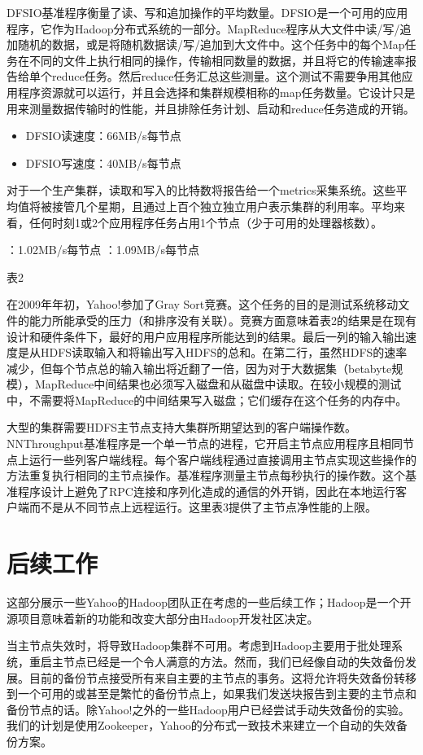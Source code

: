 DFSIO基准程序衡量了读、写和追加操作的平均数量。DFSIO是一个可用的应用程序，它作为Hadoop分布式系统的一部分。MapReduce程序从大文件中读/写/追加随机的数据，或是将随机数据读/写/追加到大文件中。这个任务中的每个Map任务在不同的文件上执行相同的操作，传输相同数量的数据，并且将它的传输速率报告给单个reduce任务。然后reduce任务汇总这些测量。这个测试不需要争用其他应用程序资源就可以运行，并且会选择和集群规模相称的map任务数量。它设计只是用来测量数据传输时的性能，并且排除任务计划、启动和reduce任务造成的开销。
\begin{itemize}
\item DFSIO读速度：66MB/s每节点
\item DFSIO写速度：40MB/s每节点
\end{itemize}
对于一个生产集群，读取和写入的比特数将报告给一个metrics采集系统。这些平均值将被接管几个星期，且通过上百个独立独立用户表示集群的利用率。平均来看，任何时刻1或2个应用程序任务占用1个节点（少于可用的处理器核数）。
\begin{itemize}
：1.02MB/s每节点
：1.09MB/s每节点
\end{itemize}

表2

在2009年年初，Yahoo!参加了Gray Sort竞赛。这个任务的目的是测试系统移动文件的能力所能承受的压力（和排序没有关联）。竞赛方面意味着表2的结果是在现有设计和硬件条件下，最好的用户应用程序所能达到的结果。最后一列的输入输出速度是从HDFS读取输入和将输出写入HDFS的总和。在第二行，虽然HDFS的速率减少，但每个节点总的输入输出将近翻了一倍，因为对于大数据集（betabyte规模），MapReduce中间结果也必须写入磁盘和从磁盘中读取。在较小规模的测试中，不需要将MapReduce的中间结果写入磁盘；它们缓存在这个任务的内存中。

大型的集群需要HDFS主节点支持大集群所期望达到的客户端操作数。NNThroughput基准程序是一个单一节点的进程，它开启主节点应用程序且相同节点上运行一些列客户端线程。每个客户端线程通过直接调用主节点实现这些操作的方法重复执行相同的主节点操作。基准程序测量主节点每秒执行的操作数。这个基准程序设计上避免了RPC连接和序列化造成的通信的外开销，因此在本地运行客户端而不是从不同节点上远程运行。这里表3提供了主节点净性能的上限。

\section{后续工作}

这部分展示一些Yahoo的Hadoop团队正在考虑的一些后续工作；Hadoop是一个开源项目意味着新的功能和改变大部分由Hadoop开发社区决定。

当主节点失效时，将导致Hadoop集群不可用。考虑到Hadoop主要用于批处理系统，重启主节点已经是一个令人满意的方法。然而，我们已经像自动的失效备份发展。目前的备份节点接受所有来自主要的主节点的事务。这将允许将失效备份转移到一个可用的或甚至是繁忙的备份节点上，如果我们发送块报告到主要的主节点和备份节点的话。除Yahoo!之外的一些Hadoop用户已经尝试手动失效备份的实验。我们的计划是使用Zookeeper，Yahoo的分布式一致技术来建立一个自动的失效备份方案。

